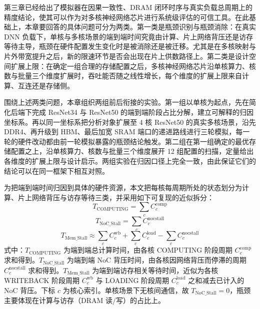 

\label{sec:c4_method}

\label{subsec:c4_problem}

第三章已经给出了模拟器在因果一致性、DRAM 闭环时序与真实负载总周期上的精度结论，使其可以作为对多核神经网络芯片进行系统级评估的可信工具。在此基础上，本章要回答的具体问题可分为两类。第一类是瓶颈识别与瓶颈消除：在真实 DNN 负载下，单核与多核场景的端到端时间究竟由计算、片上网络背压还是访存等待主导，瓶颈在硬件配置发生变化时是被消除还是被迁移。尤其是在多核映射与片外带宽提升之后，新的限速环节是否会出现在片上供数路径上。第二类是设计空间扩展上限：在确定一组合理的存储配置之后，多核神经网络芯片沿单核算力、核数与批量三个维度扩展时，吞吐能否随之线性增长，每个维度的扩展上限来自计算、互连还是存储侧。

围绕上述两类问题，本章组织两组前后衔接的实验。第一组以单核为起点，先在简化后端下完成 ResNet34 与 ResNet50 的端到端阶段占比分解，建立可解释的归因坐标系。再以同一坐标系把分析对象扩展至 4 核 ResNet50 的真实多核场景，沿先 DDR4、再升级到 HBM、最后加宽 SRAM 端口的递进路线进行三轮模拟，每一轮的硬件改动都由前一轮模拟暴露的瓶颈结论触发。第二组在第一组确定的最优存储配置之上，沿单核算力、核数与批量三个维度展开 12 组配置的扫描，定量给出各维度的扩展上限与设计启示。两组实验在归因口径上完全一致，由此保证它们的结论可以在同一框架下相互对照。

\label{subsec:c4_decomp}

为把端到端时间归因到具体的硬件资源，本文把每核每周期所处的状态划分为计算、片上网络背压与访存等待三类，并采用如下可复现的近似拆分：
\begin{equation}
  T_\text{COMPUTING} = \sum_c C^\text{comp}_c\label{eqn:c5:bottleneck_compute}
\end{equation}
\begin{equation}
  T_\text{NoC\_Stall} = \sum_c C^\text{nocstall}_c\label{eqn:c5:bottleneck_nocstall}
\end{equation}
\begin{equation}
  T_\text{Mem\_Stall} \approx \sum_c C^\text{wb}_c + \sum_c C^\text{load}_c - \sum_c C^\text{nocstall}_c\label{eqn:c5:bottleneck_memstall}
\end{equation}
式中：$T_\text{COMPUTING}$ 为端到端总计算时间，由各核 COMPUTING 阶段周期 $C^\text{comp}_c$ 求和得到。$T_\text{NoC\_Stall}$ 为端到端 NoC 背压时间，由各核因网络背压而停滞的周期 $C^\text{nocstall}_c$ 求和得到。$T_\text{Mem\_Stall}$ 为端到端访存相关等待时间，近似为各核 WRITEBACK 阶段周期 $C^\text{wb}_c$ 与 LOADING 阶段周期 $C^\text{load}_c$ 之和减去已计入的 NoC 背压。下标 $c$ 为核心索引。单核场景下无核间通信，故 $T_\text{NoC\_Stall}=0$，瓶颈主要体现在计算与访存（DRAM 读/写）的占比上。

